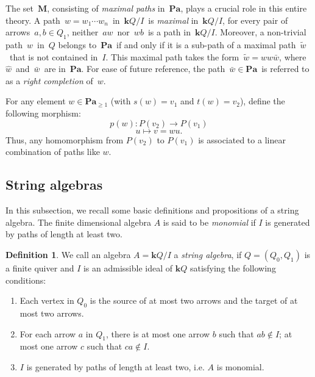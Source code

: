 \documentclass[11pt]{amsart}
\numberwithin{equation}{section}
\theoremstyle{definition}
\newtheorem{definition}[theorem]{Definition}
\begin{document}
The set \(\mathbf{M}\), consisting of \emph{maximal paths} in \(\mathbf{Pa}\), plays a crucial role in this entire theory. A path \(w = w_1 \cdots w_n\) in \(\mathbf{k}Q/I\) is \emph{maximal} in \(\mathbf{k}Q/I\), for every pair of arrows \(a, b \in Q_1\), neither $a w$ nor $wb$ is a path in \(\mathbf{k}Q/I\). Moreover, a non-trivial path $w$ in $Q $ belongs to \(\mathbf{Pa}\) if and only if it is a sub-path of a maximal path \(\widetilde{w}\) that is not contained in $I$. This maximal path takes the form \(\widetilde{w} = \hat{w} w \bar{w}\), where \(\hat{w}\) and \(\bar{w}\) are in \(\mathbf{Pa}\). For ease of future reference, the path \(\bar{w} \in \mathbf{Pa}\) is referred to as a \emph{right completion} of $w$.

For any element \( w \in \textbf{Pa}_{\geq 1} \) (with \( s(w) = v_{1} \) and \( t(w) = v_{2} \)), define the following morphism:
\[
p(w) : P(v_{2}) \to P(v_{1})
\]
\[
u \mapsto v = w u.
\]
Thus, any homomorphism
from $P(v_{2})$ to $P(v_{1})$ is associated to a linear combination of paths like $w$.



\subsection{String algebras}\label{subsection: string algebras}

In this subsection, we recall some basic definitions and propositions of  a string algebra.
The finite dimensional algebra $A$ is said to be \emph{monomial} if $I$ is generated by paths
of length at least two.

\begin{definition}\cite{AS87}\label{definition:string algebras}
We call an algebra $A=\mathbf{k}Q/I$ a \emph{string algebra}, if $Q=(Q_0,Q_1)$ is a finite quiver and $I$ is an admissible ideal of $\mathbf{k}Q$ satisfying the following conditions:
\begin{enumerate}[\rm(S1)]
 \item Each vertex in $Q_0$ is the source of at most two arrows and the target of at most two arrows.

 \item For each arrow $a$ in $Q_1$, there is at most one arrow $b$ such that  $ab\notin I$; at most one arrow $c$ such that  $ ca\notin I$.\label{S2} 

 \item $I$ is generated by paths of length at least two, i.e. $A$ is monomial.
\end{enumerate}
\end{definition}
\end{document}
